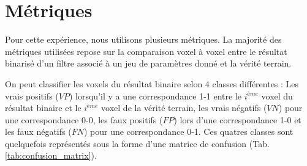 
\section{Métriques}

Pour cette expérience, nous utilisons plusieurs métriques. La majorité des métriques utilisées repose sur la comparaison voxel à voxel entre le résultat binarisé d'un filtre associé à un jeu de paramètres donné et la vérité terrain.

On peut classifier les voxels du résultat binaire selon 4 classes différentes : Les vrais positifs ($VP$) lorsqu'il y a une correspondance 1-1 entre le $i^{ème}$ voxel du résultat binaire et le $i^{ème}$ voxel de la vérité terrain, les vrais négatifs ($VN$) pour une correspondance 0-0, les faux positifs ($FP$) lors d'une correspondance 1-0 et les faux négatifs ($FN$) pour une correspondance 0-1. Ces quatres classes sont quelquefois représentés sous la forme d'une matrice de confusion (Tab. \ref{tab:confusion_matrix}).

